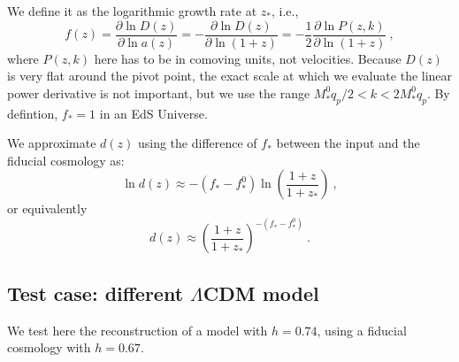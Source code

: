 We define it as the logarithmic growth rate at $z_\ast$, i.e.,
\begin{equation}
 f(z) = \frac{\partial \ln D(z)}{\partial \ln a(z)}
  = - \frac{\partial \ln D(z)}{\partial \ln (1+z)}
  = - \frac{1}{2} \frac{\partial \ln P(z,k)}{\partial \ln (1+z)} ~,
\end{equation}
where $P(z,k)$ here has to be in comoving units, not velocities.
Because $D(z)$ is very flat around the pivot point, the exact scale at which
we evaluate the linear power derivative is not important, but we use the
range $ M_\ast^0 q_p /2 < k < 2 M_\ast^0 q_p$.
By defintion, $f_\ast=1$ in an EdS Universe.

We approximate $d(z)$ using the difference of $f_\ast$ between the input
and the fiducial cosmology as:
\begin{equation}
 \ln d(z) \approx - \left( f_\ast - f^0_\ast \right) 
    \ln \left( \frac{1+z}{1+z_\ast} \right) ~,
\end{equation}
or equivalently
\begin{equation}
 d(z) \approx \left( \frac{1+z}{1+z_\ast} \right)^{- ( f_\ast - f^0_\ast)} ~.
\end{equation}


\subsection{Test case: different $\Lambda$CDM model}

We test here the reconstruction of a model with $h=0.74$, using a fiducial
cosmology with $h=0.67$.

